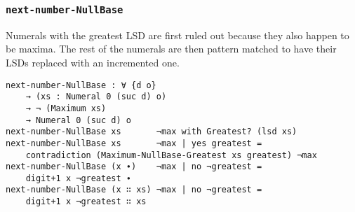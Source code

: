 \documentclass[\main/thesis.tex]{subfiles}
\begin{document}
\begin{center}
    \begin{adjustbox}{max width=\textwidth}
    \end{adjustbox}
\end{center}

\subsubsection{{\lstinline|next-number-NullBase|}}

Numerals with the greatest LSD are first ruled out because they also happen
to be maxima. The rest of the numerals are then pattern matched to have their
LSDs replaced with an incremented one.

\begin{lstlisting}
next-number-NullBase : ∀ {d o}
    → (xs : Numeral 0 (suc d) o)
    → ¬ (Maximum xs)
    → Numeral 0 (suc d) o
next-number-NullBase xs       ¬max with Greatest? (lsd xs)
next-number-NullBase xs       ¬max | yes greatest =
    contradiction (Maximum-NullBase-Greatest xs greatest) ¬max
next-number-NullBase (x ∙)    ¬max | no ¬greatest =
    digit+1 x ¬greatest ∙
next-number-NullBase (x ∷ xs) ¬max | no ¬greatest =
    digit+1 x ¬greatest ∷ xs
\end{lstlisting}
\end{document}
